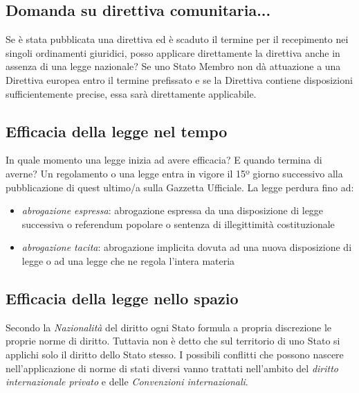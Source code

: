 \subsection{Domanda su direttiva comunitaria...}
Se è stata pubblicata una direttiva ed è scaduto il termine per il recepimento nei singoli ordinamenti giuridici,
posso applicare direttamente la direttiva anche in assenza di una legge nazionale? \newline
Se uno Stato Membro non dà attuazione a una Direttiva europea entro il termine prefissato e se la Direttiva contiene
disposizioni sufficientemente precise, essa sarà direttamente applicabile.

\subsection{Efficacia della legge nel tempo}
In quale momento una legge inizia ad avere efficacia? E quando termina di averne? \newline
Un regolamento o una legge entra in vigore il 15º giorno successivo alla pubblicazione di quest ultimo/a sulla Gazzetta Ufficiale. \newline
La legge perdura fino ad:
\begin{itemize}
    \item\emph{abrogazione espressa}: abrogazione espressa da una disposizione di legge successiva o referendum popolare o sentenza
        di illegittimità costituzionale 
    \item\emph{abrogazione tacita}: abrogazione implicita dovuta ad una nuova disposizione di legge o ad una legge che ne regola 
        l'intera materia
\end{itemize}

\subsection{Efficacia della legge nello spazio}
Secondo la \emph{Nazionalità} del diritto ogni Stato formula a propria discrezione le proprie norme
di diritto. Tuttavia non è detto che sul territorio di uno Stato si applichi solo il diritto dello Stato stesso. \newline
I possibili conflitti che possono nascere nell'applicazione di norme di stati diversi vanno trattati 
nell'ambito del \emph{diritto internazionale privato} e delle \emph{Convenzioni internazionali}.

